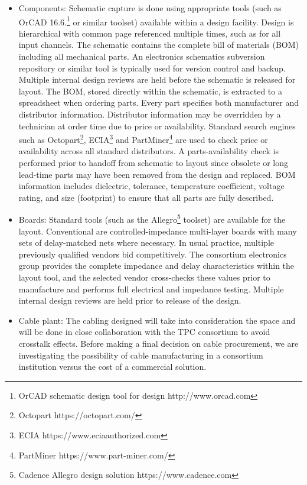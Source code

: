 \begin{itemize}

\item Components: Schematic capture is done using appropriate tools (such as OrCAD 16.6.\footnote{OrCAD\texttrademark{} schematic design tool for  design http://www.orcad.com} or similar toolset) available within a design facility. Design is hierarchical with common  page referenced multiple times, such as for all input channels. 
The schematic contains the complete bill of materials (BOM) including all mechanical parts. An electronics schematics subversion
repository or similar tool is typically used for version control and backup. Multiple internal design reviews are held before the schematic is released %
for layout. The BOM, stored directly within the schematic, is extracted to a spreadsheet when ordering parts. Every part specifies %
both manufacturer and distributor information. Distributor information may be overridden by a technician at order time due to price or availability. Standard search engines such as Octopart\footnote{Octopart https://octopart.com/}, ECIA\footnote{ ECIA https://www.eciaauthorized.com} and PartMiner\footnote{PartMiner https://www.part-miner.com/} are used to check price or availability across all standard distributors. A parts-availability check %
is performed prior to handoff from schematic to layout since %
obsolete or long lead-time parts %
may have been removed from the design and replaced. BOM information includes dielectric, tolerance, temperature coefficient, voltage rating, and size (footprint) to ensure that all parts are fully described.

\item Boards: Standard tools (such as the Allegro\footnote{Cadence Allegro\textregistered {} design solution https://www.cadence.com} toolset) are available for the  layout. Conventional  are 
controlled-impedance multi-layer boards with many sets of delay-matched nets where necessary.
In usual practice, multiple previously qualified vendors bid competitively. The consortium electronics group provides the complete impedance and delay characteristics  within the layout tool, and the selected vendor cross-checks these values prior to manufacture and performs full electrical and impedance testing.  Multiple internal design reviews are held prior to release of the design.

\item Cable plant: The cabling designed will take into consideration the  space and will be done in close collaboration with the TPC  consortium to avoid crosstalk effects.  
Before making a final decision on cable procurement, we are investigating the possibility of cable manufacturing in a  consortium institution versus the cost of a commercial solution.  


\end{itemize}
